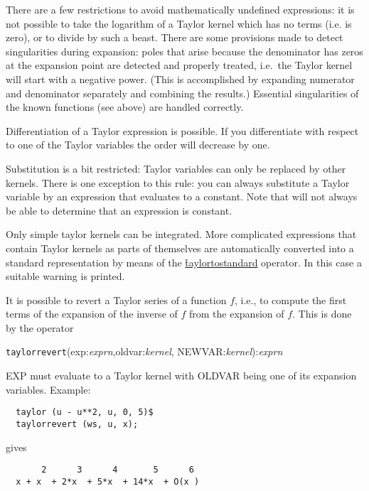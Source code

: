 There are a few restrictions to avoid mathematically undefined
expressions: it is not possible to take the logarithm of a Taylor
kernel which has no terms (i.e. is zero), or to divide by such a
beast.  There are some provisions made to detect singularities during
expansion: poles that arise because the denominator has zeros at the
expansion point are detected and properly treated, i.e.\ the Taylor
kernel will start with a negative power.  (This is accomplished by
expanding numerator and denominator separately and combining the
results.)  Essential singularities of the known functions (see above)
are handled correctly.

Differentiation of a Taylor expression is possible.  If you
differentiate with respect to one of the Taylor variables the order
will decrease by one.

Substitution is a bit restricted: Taylor variables can only be replaced
by other kernels.  There is one exception to this rule: you can always
substitute a Taylor variable by an expression that evaluates to a
constant.  Note that \REDUCE{} will not always be able to determine
that an expression is constant.

Only simple taylor kernels can be integrated. More complicated
expressions that contain Taylor kernels as parts of themselves are
automatically converted into a standard representation by means of the
\hyperlink{operator:TAYLORTOSTANDARD}{\f{taylortostandard}} operator. 
In this case a suitable warning is printed.

 It is possible to revert a Taylor
series of a function $f$, i.e., to compute the first terms of the
expansion of the inverse of $f$ from the expansion of $f$. This is
done by the operator

\hypertarget{operator:TAYLORREVERT}{}
\hspace*{2em} \texttt{taylorrevert}(exp:\emph{exprn},oldvar:\emph{kernel},
                                 NEWVAR:\emph{kernel}):\emph{exprn}

EXP must evaluate to a Taylor kernel with OLDVAR being one of its
expansion variables. Example:
\begin{verbatim}
  taylor (u - u**2, u, 0, 5)$
  taylorrevert (ws, u, x);
\end{verbatim}
gives
\begin{verbatim}
       2      3      4       5      6
  x + x  + 2*x  + 5*x  + 14*x  + O(x )
\end{verbatim}

